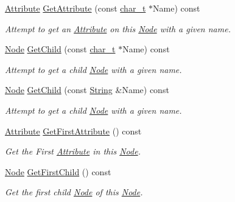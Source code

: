 \begin{DoxyCompactItemize}
\hyperlink{classMezzanine_1_1xml_1_1Attribute}{Attribute} \hyperlink{classMezzanine_1_1xml_1_1Node_af165e3fb0e652483761b1408e141dd00}{GetAttribute} (const \hyperlink{namespaceMezzanine_1_1xml_a29b8a47c179e9895c4e9e66c45d1dbbc}{char\_\-t} $\ast$Name) const 
\begin{DoxyCompactList}\small\item\em Attempt to get an \hyperlink{classMezzanine_1_1xml_1_1Attribute}{Attribute} on this \hyperlink{classMezzanine_1_1xml_1_1Node}{Node} with a given name. \item\end{DoxyCompactList}\item 
\hyperlink{classMezzanine_1_1xml_1_1Node}{Node} \hyperlink{classMezzanine_1_1xml_1_1Node_abb2e51765b16a3373ee81b288fd74b22}{GetChild} (const \hyperlink{namespaceMezzanine_1_1xml_a29b8a47c179e9895c4e9e66c45d1dbbc}{char\_\-t} $\ast$Name) const 
\begin{DoxyCompactList}\small\item\em Attempt to get a child \hyperlink{classMezzanine_1_1xml_1_1Node}{Node} with a given name. \item\end{DoxyCompactList}\item 
\hyperlink{classMezzanine_1_1xml_1_1Node}{Node} \hyperlink{classMezzanine_1_1xml_1_1Node_af09cd42733bc14079085e237b1d70ae5}{GetChild} (const \hyperlink{namespaceMezzanine_1_1xml_a3ddf35656ecc38b6fa1d0364d9ad3b2c}{String} \&Name) const 
\begin{DoxyCompactList}\small\item\em Attempt to get a child \hyperlink{classMezzanine_1_1xml_1_1Node}{Node} with a given name. \item\end{DoxyCompactList}\item 
\hyperlink{classMezzanine_1_1xml_1_1Attribute}{Attribute} \hyperlink{classMezzanine_1_1xml_1_1Node_af16bcd37c220278b9f6b9f1c76e67ec8}{GetFirstAttribute} () const 
\begin{DoxyCompactList}\small\item\em Get the First \hyperlink{classMezzanine_1_1xml_1_1Attribute}{Attribute} in this \hyperlink{classMezzanine_1_1xml_1_1Node}{Node}. \item\end{DoxyCompactList}\item 
\hyperlink{classMezzanine_1_1xml_1_1Node}{Node} \hyperlink{classMezzanine_1_1xml_1_1Node_a021b679fc715d49935de32d85ded2b65}{GetFirstChild} () const 
\begin{DoxyCompactList}\small\item\em Get the first child \hyperlink{classMezzanine_1_1xml_1_1Node}{Node} of this \hyperlink{classMezzanine_1_1xml_1_1Node}{Node}. \item\end{DoxyCompactList}\item 

\end{DoxyCompactItemize}

